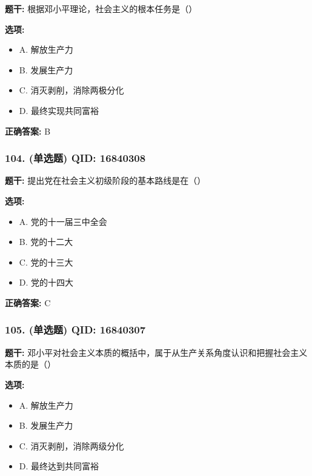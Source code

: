 \documentclass[12pt,UTF8]{ctexart}
\begin{document}
\textbf{题干:}
根据邓小平理论，社会主义的根本任务是（）

\textbf{选项:}
\begin{itemize}[leftmargin=*]

  \item A. 解放生产力

  \item B. 发展生产力

  \item C. 消灭剥削，消除两极分化

  \item D. 最终实现共同富裕

\end{itemize}

\textbf{正确答案:}
B

\vspace{0.3em}\hrulefill\vspace{0.7em}

\subsubsection*{104. (单选题) \small QID: 16840308}

\textbf{题干:}
提出党在社会主义初级阶段的基本路线是在（）

\textbf{选项:}
\begin{itemize}[leftmargin=*]

  \item A. 党的十一届三中全会

  \item B. 党的十二大

  \item C. 党的十三大

  \item D. 党的十四大

\end{itemize}

\textbf{正确答案:}
C

\vspace{0.3em}\hrulefill\vspace{0.7em}

\subsubsection*{105. (单选题) \small QID: 16840307}

\textbf{题干:}
邓小平对社会主义本质的概括中，属于从生产关系角度认识和把握社会主义本质的是（）

\textbf{选项:}
\begin{itemize}[leftmargin=*]

  \item A. 解放生产力

  \item B. 发展生产力

  \item C. 消灭剥削，消除两级分化

  \item D. 最终达到共同富裕

\end{itemize}
\end{document}
